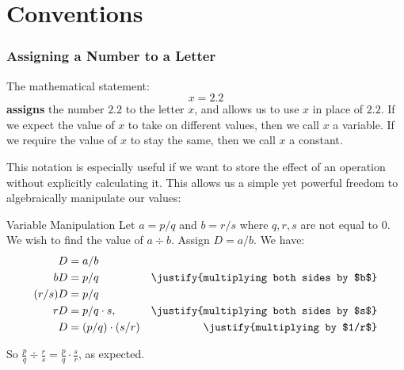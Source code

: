 \section{Conventions}
  \subsubsection{Assigning a Number to a Letter}
  The mathematical statement:
  $$x = 2.2$$
  \textbf{assigns} the number $2.2$ to the letter $x$, and allows us to use $x$
  in place of $2.2$. If we expect the value of $x$ to take on different values,
  then we call $x$ a variable. If we require the value of $x$ to stay the same,
  then we call $x$ a constant.

  This notation is especially useful if we want to store the effect of an
  operation without explicitly calculating it. This allows us a simple yet
  powerful freedom to algebraically manipulate our values:

  \begin{expl}{Variable Manipulation}
    Let $a = p/q$ and $b = r/s$ where $q, r, s$ are not equal to $0$.
    We wish to find the value of $a \div b$. Assign $D = a/b$. We have:
    \begin{align}
      D       &= a/b \\
      bD      &= p/q     & \justify{multiplying both sides by $b$}\\
      (r/s)D  &= p/q \\
      rD      &= p/q \cdot s, &\justify{multiplying both sides by $s$} \\
      D       &= (p/q) \cdot (s/r) & \justify{multiplying by $1/r$}
    \end{align}

    So $\displaystyle{\frac{p}{q} \div \frac{r}{s} =
     \frac{p}{q} \cdot \frac{s}{r}}$,
    as expected.
    \begin{comment}
    We wish to find the value of the infinitely nested square root
    $\sqrt{6\sqrt{6 \sqrt{6 ...}}}$. Let $x = \sqrt{6\sqrt{6 \sqrt{6 ...}}}$.
    Then:
    \begin{align*}
      x^2 &= 6 \sqrt{6 \sqrt{6 ...}} \\
      x^2 &= 6x \\
      x^2 - 6x &= 0 \\
      x(x-6) &= 0
    \end{align*}

    So either $x=0$ or $x=6$. Since
    $\sqrt{6 \sqrt{6 ...}} > \sqrt{6 \sqrt{0}} = 0$ we must have that $x = 6$.
    \end{comment}
  \end{expl}

